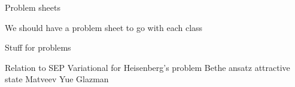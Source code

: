 
Problem sheets

We should have a problem sheet to go with each class

Stuff for problems

Relation to SEP
Variational for Heisenberg's problem
Bethe ansatz attractive state
Matveev Yue Glazman
